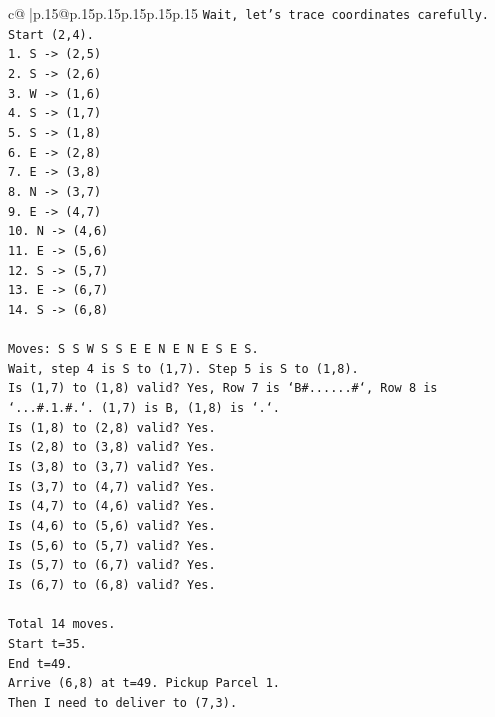 \documentclass{article}
\begin{document}
{\begin{supertabular}{c@{$\;$}|p{.15\linewidth}@{}p{.15\linewidth}p{.15\linewidth}p{.15\linewidth}p{.15\linewidth}p{.15\linewidth}}
{{{\texttt{Wait, let's trace coordinates carefully.} \\
\texttt{Start (2,4).} \\
\texttt{1. S {-}> (2,5)} \\
\texttt{2. S {-}> (2,6)} \\
\texttt{3. W {-}> (1,6)} \\
\texttt{4. S {-}> (1,7)} \\
\texttt{5. S {-}> (1,8)} \\
\texttt{6. E {-}> (2,8)} \\
\texttt{7. E {-}> (3,8)} \\
\texttt{8. N {-}> (3,7)} \\
\texttt{9. E {-}> (4,7)} \\
\texttt{10. N {-}> (4,6)} \\
\texttt{11. E {-}> (5,6)} \\
\texttt{12. S {-}> (5,7)} \\
\texttt{13. E {-}> (6,7)} \\
\texttt{14. S {-}> (6,8)} \\
\\ 
\texttt{Moves: S S W S S E E N E N E S E S.} \\
\texttt{Wait, step 4 is S to (1,7). Step 5 is S to (1,8).} \\
\texttt{Is (1,7) to (1,8) valid? Yes, Row 7 is `B\#......\#`, Row 8 is `...\#.1.\#.`. (1,7) is B, (1,8) is `.`.} \\
\texttt{Is (1,8) to (2,8) valid? Yes.} \\
\texttt{Is (2,8) to (3,8) valid? Yes.} \\
\texttt{Is (3,8) to (3,7) valid? Yes.} \\
\texttt{Is (3,7) to (4,7) valid? Yes.} \\
\texttt{Is (4,7) to (4,6) valid? Yes.} \\
\texttt{Is (4,6) to (5,6) valid? Yes.} \\
\texttt{Is (5,6) to (5,7) valid? Yes.} \\
\texttt{Is (5,7) to (6,7) valid? Yes.} \\
\texttt{Is (6,7) to (6,8) valid? Yes.} \\
\\ 
\texttt{Total 14 moves.} \\
\texttt{Start t=35.} \\
\texttt{End t=49.} \\
\texttt{Arrive (6,8) at t=49. Pickup Parcel 1.} \\
\texttt{Then I need to deliver to (7,3).} \\
}}}
\end{supertabular}}
\end{document}
